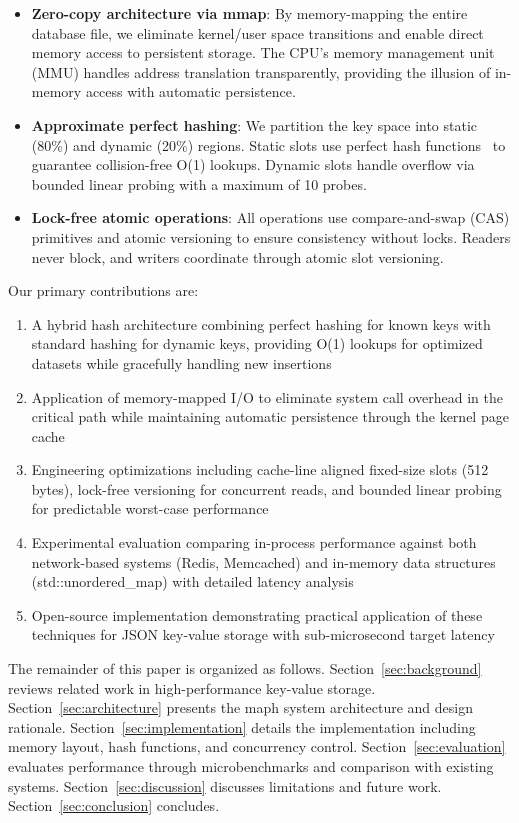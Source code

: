 \documentclass[10pt,conference]{IEEEtran}
\begin{document}
\begin{itemize}
\item \textbf{Zero-copy architecture via mmap}: By memory-mapping the entire database file, we eliminate kernel/user space transitions and enable direct memory access to persistent storage. The CPU's memory management unit (MMU) handles address translation transparently, providing the illusion of in-memory access with automatic persistence.

\item \textbf{Approximate perfect hashing}: We partition the key space into static (80\%) and dynamic (20\%) regions. Static slots use perfect hash functions~\cite{chd-algorithm,bbhash} to guarantee collision-free O(1) lookups. Dynamic slots handle overflow via bounded linear probing with a maximum of 10 probes.

\item \textbf{Lock-free atomic operations}: All operations use compare-and-swap (CAS) primitives and atomic versioning to ensure consistency without locks. Readers never block, and writers coordinate through atomic slot versioning.
\end{itemize}

Our primary contributions are:

\begin{enumerate}
\item A hybrid hash architecture combining perfect hashing for known keys with standard hashing for dynamic keys, providing O(1) lookups for optimized datasets while gracefully handling new insertions
\item Application of memory-mapped I/O to eliminate system call overhead in the critical path while maintaining automatic persistence through the kernel page cache
\item Engineering optimizations including cache-line aligned fixed-size slots (512 bytes), lock-free versioning for concurrent reads, and bounded linear probing for predictable worst-case performance
\item Experimental evaluation comparing in-process performance against both network-based systems (Redis, Memcached) and in-memory data structures (std::unordered\_map) with detailed latency analysis
\item Open-source implementation demonstrating practical application of these techniques for JSON key-value storage with sub-microsecond target latency
\end{enumerate}

The remainder of this paper is organized as follows. Section~\ref{sec:background} reviews related work in high-performance key-value storage. Section~\ref{sec:architecture} presents the maph system architecture and design rationale. Section~\ref{sec:implementation} details the implementation including memory layout, hash functions, and concurrency control. Section~\ref{sec:evaluation} evaluates performance through microbenchmarks and comparison with existing systems. Section~\ref{sec:discussion} discusses limitations and future work. Section~\ref{sec:conclusion} concludes.
\end{document}
